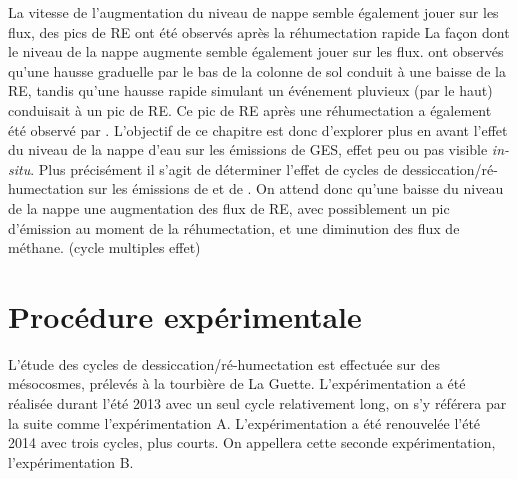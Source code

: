 La vitesse de l'augmentation du niveau de nappe semble également jouer sur les flux, des pics de RE ont été observés après la réhumectation rapide 
La façon dont le niveau de la nappe augmente semble également jouer sur les flux.
\citet{strack2009} ont observés qu'une hausse graduelle par le bas de la colonne de sol conduit à une baisse de la RE, tandis qu'une hausse rapide simulant un événement pluvieux (par le haut) conduisait à un pic de RE.
Ce pic de RE après une réhumectation a également été observé par \citet{mcneil2003}.
L'objectif de ce chapitre est donc d'explorer plus en avant l'effet du niveau de la nappe d'eau sur les émissions de GES, effet peu ou pas visible \textit{in-situ}.
Plus précisément il s'agit de déterminer l'effet de cycles de dessiccation/ré-humectation sur les émissions de \coo et de \chh. 
On attend donc qu'une baisse du niveau de la nappe une augmentation des flux de RE, avec possiblement un pic d'émission au moment de la réhumectation, et une diminution des flux de méthane.
(\plop cycle multiples effet)

\section{Procédure expérimentale}

L'étude des cycles de dessiccation/ré-humectation est effectuée sur des mésocosmes, prélevés à la tourbière de La Guette.
L'expérimentation a été réalisée durant l'été 2013 avec un seul cycle relativement long, on s'y référera par la suite comme l'expérimentation A.
L'expérimentation a été renouvelée l'été 2014 avec trois cycles, plus courts.
On appellera cette seconde expérimentation, l'expérimentation B.

